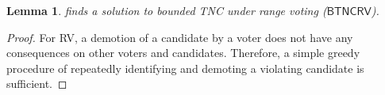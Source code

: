\documentclass[letterpaper]{article} %
\newtheorem{lemma}{Lemma}
\newcommand{\var}{\texttt}
\newcommand{\SB}{\textsc{TNC}}
\newcommand{\CF}{\mathsf{BTNCRV}}
\begin{document}
\begin{lemma}
 finds a solution to bounded \SB{} under range voting ($\CF$).
\end{lemma}
\begin{proof}
For RV, a demotion of a candidate by a voter does not have any consequences on other voters and candidates. Therefore, a simple greedy procedure of repeatedly identifying and demoting a violating candidate is sufficient. \end{proof}
\end{document}
